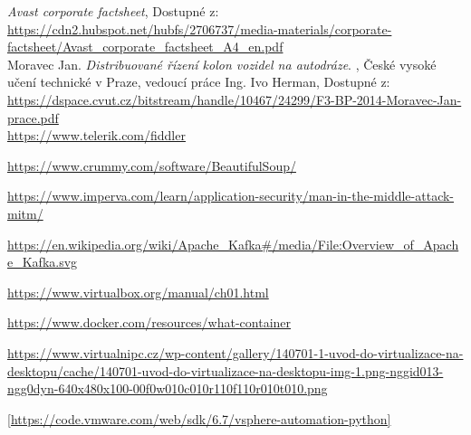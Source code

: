 \documentclass[thesis=M,czech,hidelinks]{FITthesis}[2013/05/06]
\begin{document}
 \setlength{\parskip}{10pt}





\begin{conclusion}









\end{conclusion}




\begin{thebibliography}{9}

    \textit{Avast corporate factsheet}, Dostupné z: \\       \url{https://cdn2.hubspot.net/hubfs/2706737/media-materials/corporate-factsheet/Avast_corporate_factsheet_A4_en.pdf} \\
       	
       	Moravec Jan. \textit{Distribuované řízení kolon vozidel na autodráze}. , České vysoké učení technické v Praze, vedoucí práce Ing. Ivo Herman, Dostupné z: \\    \url{https://dspace.cvut.cz/bitstream/handle/10467/24299/F3-BP-2014-Moravec-Jan-prace.pdf} \\
    
    \url{https://www.telerik.com/fiddler}
    
    \url{https://www.crummy.com/software/BeautifulSoup/} 	

    
    \url{https://www.imperva.com/learn/application-security/man-in-the-middle-attack-mitm/}


	\url{https://en.wikipedia.org/wiki/Apache_Kafka#/media/File:Overview_of_Apache_Kafka.svg}
	
	\url{https://www.virtualbox.org/manual/ch01.html}
	
	\url{https://www.docker.com/resources/what-container}
	
	\url{https://www.virtualnipc.cz/wp-content/gallery/140701-1-uvod-do-virtualizace-na-desktopu/cache/140701-uvod-do-virtualizace-na-desktopu-img-1.png-nggid013-ngg0dyn-640x480x100-00f0w010c010r110f110r010t010.png}
	
	\url{[https://code.vmware.com/web/sdk/6.7/vsphere-automation-python]}
	

\end{thebibliography}
\end{document}

